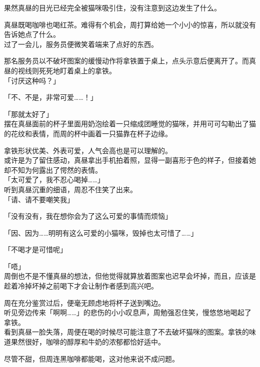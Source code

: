 果然真昼的目光已经完全被猫咪吸引住，没有注意到这边发生了什么。

真昼既喝咖啡也喝红茶。难得有个机会，周打算给她一个小小的惊喜，所以就没有告诉她点了什么。\\

过了一会儿，服务员便微笑着端来了点好的东西。

那名服务员以不破坏图案的缓慢动作将拿铁置于桌上，点头示意后便离开了。而真昼的视线则死死地盯着桌上的拿铁。\\

「讨厌这种吗？」

「不、不是，非常可爱……！」

「那就太好了」\\

摆在真昼面前的杯子里面用奶泡绘着一只缩成团睡觉的猫咪，并用可可勾勒出了猫的花纹和表情，而周的杯中画着一只猫靠在杯子边缘。

拿铁形状优美、外表可爱，人气会高也是可以理解的。\\

或许是为了留住感动，真昼拿出手机拍着照，显得一副喜形于色的样子，但接着她却不知为何露出了愕然的表情。\\

「太可爱了，我不忍心喝掉……」\\

听到真昼沉重的细语，周忍不住笑了出来。\\

「请、请不要嘲笑我」

「没有没有，我在想你会为了这么可爱的事情而烦恼」

「因、因为……明明有这么可爱的小猫咪，毁掉也太可惜了……」

「不喝才是可惜呢」

「唔」\\

周倒也不是不懂真昼的想法，但他觉得就算放着图案也迟早会坏掉，而且，应该是趁着冷掉坏掉之前喝下才会让制作者感到高兴吧。

周在充分鉴赏过后，便毫无顾虑地将杯子送到嘴边。\\

听见旁边传来「啊啊……」的悲伤的小小叹息声，周勉强忍住笑，慢悠悠地喝起了拿铁。\\

看到真昼一脸失落，周便在喝的时候尽可能注意了不去破坏猫咪的图案。拿铁的味道果然很好，咖啡的醇厚和牛奶的浓郁都恰好适中。

尽管不甜，但周连黑咖啡都能喝，这对他来说不成问题。\\

